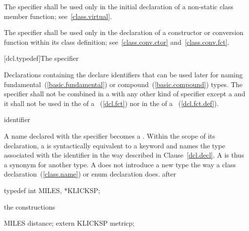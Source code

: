 \pnum
{}%
The  specifier shall be used only in the initial
declaration of a non-static class member function;
see~\ref{class.virtual}.

\pnum
{}%
The  specifier shall be used only in the declaration of
a constructor or conversion function within its class definition;
see~\ref{class.conv.ctor} and~\ref{class.conv.fct}.

[dcl.typedef]{The  specifier}%

\pnum
Declarations containing the  
declare identifiers that can be used later for naming
fundamental~(\ref{basic.fundamental}) or compound~(\ref{basic.compound})
types. The  specifier shall not be
combined in a  with any other kind of
specifier except a  and it shall not be used in the
 of a
~(\ref{dcl.fct}) nor in the
 of a
~(\ref{dcl.fct.def}).

\begin{bnf}
\br
    identifier
\end{bnf}

A name declared with the  specifier becomes a
. Within the scope of its declaration, a
 is syntactically equivalent to a keyword and
names the type associated with the identifier in the way described in
Clause~\ref{dcl.decl}.
%
%
%
A  is thus a synonym for another type. A
 does not introduce a new type the way a class
declaration~(\ref{class.name}) or enum declaration does.
\enterexample
{}%
after

\begin{codeblock}
typedef int MILES, *KLICKSP;
\end{codeblock}

the constructions

\begin{codeblock}
MILES distance;
extern KLICKSP metricp;
\end{codeblock}

